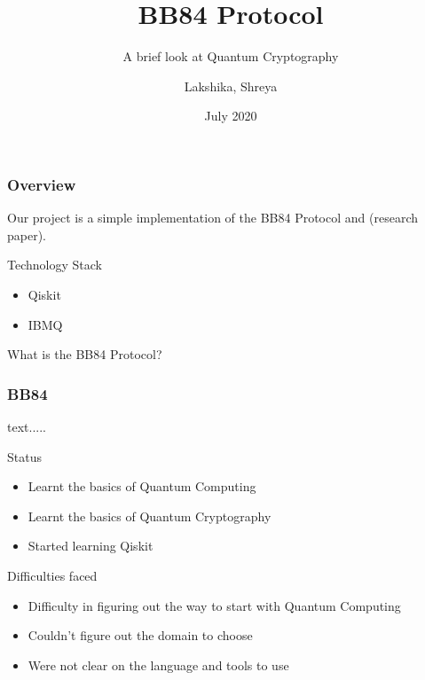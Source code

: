 \documentclass[14 pt]{beamer}
\title[BB84]{BB84 Protocol}
\subtitle{A brief look at Quantum Cryptography}
\author[Team 37]{Lakshika, Shreya}
\date{July 2020}
\begin{document}
\begin{frame}
	\titlepage
\end{frame}

\begin{frame}
	\frametitle{Overview}
	Our project is a simple implementation of the BB84 Protocol and (research paper).
\end{frame}

\begin{frame}{Technology Stack}
	\begin{itemize}
		\item Qiskit
		\item IBMQ
	\end{itemize}
\end{frame}

\begin{frame}[standout]
	What is the BB84 Protocol?
\end{frame}

\begin{frame}
	\frametitle{BB84}
		text.....
\end{frame}

\begin{frame}{Status}
	\begin{itemize}
		\item Learnt the basics of Quantum Computing
		\item Learnt the basics of Quantum Cryptography
		\item Started learning Qiskit
	\end{itemize}
\end{frame}

\begin{frame}{Difficulties faced}
	\begin{itemize}
		\item Difficulty in figuring out the way to start with Quantum Computing
		\item Couldn't figure out the domain to choose 
		\item Were not clear on the language and tools to use
	\end{itemize}
\end{frame}
		
\end{document}
